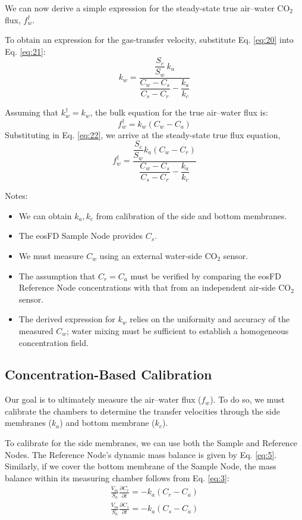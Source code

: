 \documentclass[11pt]{article}
\begin{document}
We can now derive a simple expression for the steady-state true air--water CO$_2$ flux, $f_w^\dagger$.

To obtain an expression for the gas-transfer velocity, substitute Eq. \ref{eq:20} into Eq. \ref{eq:21}:
\begin{equation}\label{eq:22} 
	\boxed{k_w = \frac{\dfrac{S_c}{S_w}\,k_a} {\dfrac{C_w-C_s}{C_s-C_r}-\dfrac{k_a}{k_c}}}
\end{equation}

Assuming that $k_w^\dagger = k_w$, the bulk equation for the true air--water flux is:
\begin{equation}\label{eq:23}
	f_w^\dagger = k_w(C_w - C_a)
\end{equation}	
Substituting in Eq. \ref{eq:22}, we arrive at the steady-state true flux equation,
\begin{equation}\label{eq:24}
	\boxed{f_w^\dagger = \frac{\dfrac{S_c}{S_w}k_a(C_w - C_r)}{\dfrac{C_w - C_s}{C_s - C_r} - \dfrac{k_a}{k_c}}}
\end{equation}

Notes:
\begin{itemize}
	\item We can obtain $k_a, k_c$ from calibration of the side and bottom membranes.
	\item The eosFD Sample Node provides $C_s$.
	\item We must measure $C_w$ using an external water-side CO$_2$ sensor.
	\item The assumption that $C_r = C_a$ must be verified by comparing the eosFD Reference Node concentrations with that from an independent air-side CO$_2$ sensor.
	\item The derived expression for $k_w$ relies on the uniformity and accuracy of the measured $C_w$; water mixing must be sufficient to establish a homogeneous concentration field.
\end{itemize}


\subsection{Concentration-Based Calibration}
Our goal is to ultimately measure the air--water flux ($f_w$). To do so, we must calibrate the chambers to determine the transfer velocities through the side membranes ($k_a$) and bottom membrane ($k_c$).

To calibrate for the side membranes, we can use both the Sample and Reference Nodes. The Reference Node's dynamic mass balance is given by Eq. \ref{eq:5}. Similarly, if we cover the bottom membrane of the Sample Node, the mass balance within its measuring chamber follows from Eq. \ref{eq:3}:
\begin{subequations}\label{eq:25}
	\begin{align}
		\frac{V_m}{S_a} \frac{\partial C_r}{\partial t} = -k_a(C_r - C_a) \label{eq:a} \\
		\frac{V_m}{S_a} \frac{\partial C_s}{\partial t} = -k_a(C_s - C_a) \label{eq:b}		 
	\end{align}
\end{subequations}
\end{document}

